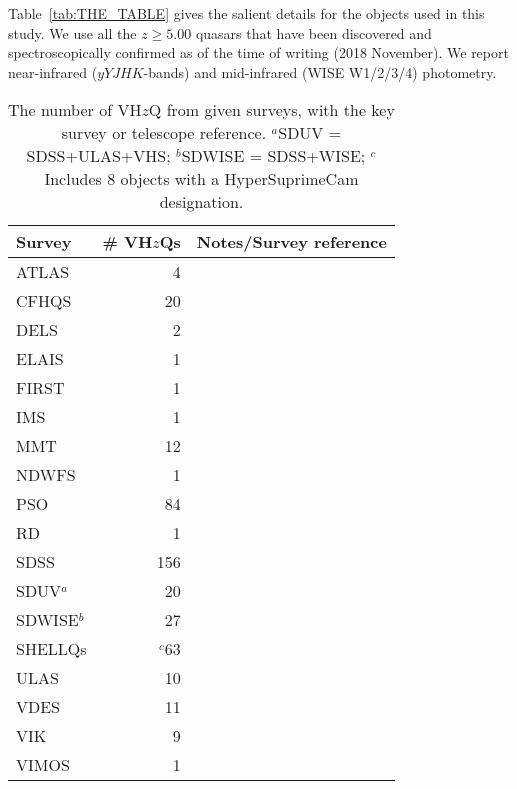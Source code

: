 \documentclass[usenatbib]{mnras}
\begin{document}
Table~\ref{tab:THE_TABLE} gives the salient details for the objects
used in this study. We use all the $z\geq5.00$ quasars that have been
discovered and spectroscopically confirmed as of the time of writing
(2018 November). We report near-infrared ($yYJHK$-bands) and
mid-infrared (WISE W1/2/3/4) photometry.

\begin{table}
\begin{tabular}{l r l}
\hline  \hline
Survey              & \# VH$z$Qs & Notes/Survey reference  \\
\hline  
  ATLAS             &     4       &  \citet{Shanks2015} \\
  CFHQS            &   20       &  \citet{Willott2007} \\
  DELS               &     2       &  \citet{Dey2018} \\
  ELAIS              &     1       &  \citet{Vaisanen2000} \\
  FIRST              &     1       &  \citet{Becker1995} \\
  IMS                 &     1        &  \citet{Kim2015} \\
  MMT               &   12        &  \citet{McGreer2013} \\
  NDWFS           &     1         &  \citet{JD1999} \\
  PSO                 &   84         &   \citet{Kaiser2002, Kaiser2010} \\
  RD                   &     1         &  \citet{Mahabal2005} \\
  SDSS                & 156         & \citet{EDR} \\
  SDUV$^{a}$       &   20         & \citet{YangJ2017} \\
 SDWISE$^{b}$    &   27         &   \citet{WangF2016} \\
  SHELLQs         &  $^{c}$63   &  \citet{Matsuoka2016} \\  %
  ULAS               &   10          & \citet{Lawrence2007} \\
  VDES              &   11          &  \citet{Reed2017} \\
  VIK                 &     9          &  \citet{Edge2013} \\
  VIMOS           &    1            &   \citet{LeFevre2003} \\
\hline  \hline
\end{tabular}
\caption{The number of VH$z$Q from given surveys, with the key survey or telescope reference.  
  $^{a}$SDUV  = SDSS+ULAS+VHS; 
  $^{b}$SDWISE = SDSS+WISE; 
  $^{c}$Includes 8 objects with a HyperSuprimeCam \citep[HSC; ][]{Miyazaki2018} designation.}
      \label{tab:surveys}
\end{table}
\end{document}
